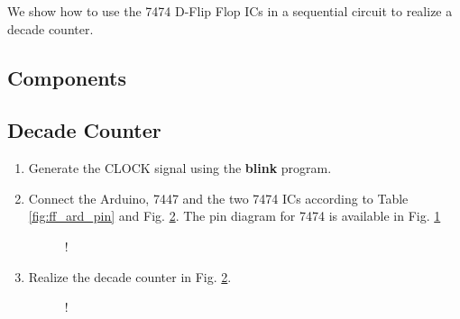 We show how to use the 7474 D-Flip Flop ICs in
a sequential circuit to realize a decade counter.
\subsection{Components}
\begin{table}[!ht]
\centering

\caption{}
\label{table:components-7474}
\end{table}

\subsection{Decade Counter}
\begin{enumerate}[label=\arabic*.,ref=\theenumi]
\item
Generate the CLOCK signal using the \textbf{blink} program. 


\item
Connect the Arduino, 7447 and the two 7474 ICs according to Table \ref{fig:ff_ard_pin} and Fig. \ref{fig:decade_counter}. The pin diagram for 7474 is available in Fig. \ref{fig:7474}

			\begin{table*}[!ht]
\centering

\caption{}
\label{fig:ff_ard_pin}
\end{table*}
%
\begin{figure}[!ht]
\begin{center}
\resizebox {\columnwidth} {!} {

}
\end{center}
\caption{}
\label{fig:7474}
\end{figure}

%
\item
			\iffalse
Intelligently use the code in 
\begin{lstlisting}
ide/7447/codes/inc_dec/inc_dec.ino
\end{lstlisting}
and
			
\begin{lstlisting}
wget https://raw.githubusercontent.com/gadepall/arduino/master/7447/codes/ip_inc_dec/ip_inc_dec.ino
\end{lstlisting}
\fi
Realize the decade counter in Fig. \ref{fig:decade_counter}.
 
 \begin{figure}[!ht]
\begin{center}
\resizebox {\columnwidth} {!} {

}
\end{center}
\caption{}
\label{fig:decade_counter}
\end{figure}
%

	\end{enumerate}


